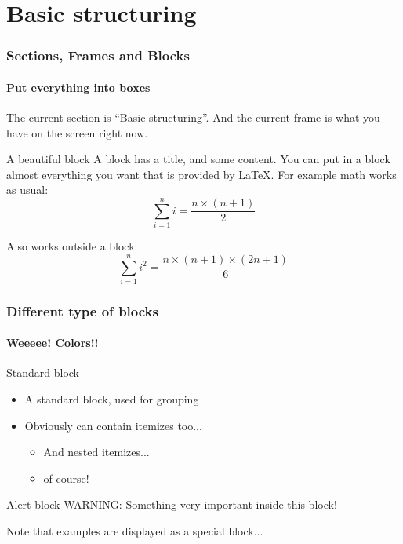 \documentclass[10pt]{beamer}
\begin{document}
\section{Basic structuring}
\begin{frame}
  \frametitle{Sections, Frames and Blocks}
  \framesubtitle{Put everything into boxes}

  The current section is "`Basic structuring"'. And the current frame
  is what you have on the screen right now.

  \begin{block}{A beautiful block}
  A block has a title, and some content. You can put in a block
  almost everything you want that is provided by LaTeX. For example
  math works as usual:
    \begin{equation}
    \sum_{i=1}^n i = \frac{n \times (n+1)}{2}
    \end{equation}
  \end{block}

  Also works outside a block:
  \begin{equation}
  \sum_{i=1}^n i^2 = \frac{n \times (n+1) \times (2n+1)}{6}
  \end{equation}
\end{frame}

\begin{frame}
  \frametitle{Different type of blocks}
  \framesubtitle{Weeeee! Colors!!}
  \begin{block}{Standard block}
  \begin{itemize}
    \item A standard block, used for grouping
    \item Obviously can contain itemizes too...
    \begin{itemize}
      \item And nested itemizes...
      \item of course!
    \end{itemize}
  \end{itemize}
  \end{block}
  \begin{alertblock}{Alert block}
  WARNING: Something very important inside this block!
  \end{alertblock}
  \begin{example}
  Note that examples are displayed as a special block...
  \end{example}
\end{frame}
\end{document}
